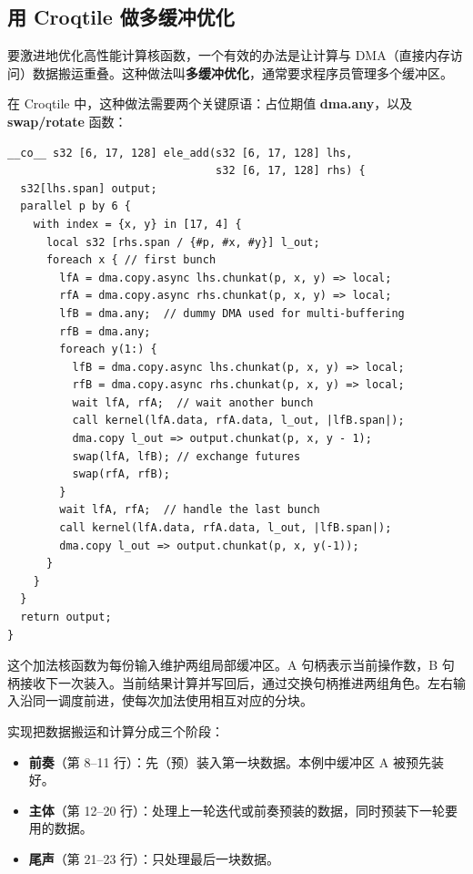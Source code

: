 \subsection*{用 Croqtile 做多缓冲优化}

要激进地优化高性能计算核函数，一个有效的办法是让计算与 DMA（直接内存访问）数据搬运重叠。这种做法叫\textbf{多缓冲优化}，通常要求程序员管理多个缓冲区。

在 Croqtile 中，这种做法需要两个关键原语：占位期值 \textbf{dma.any}，以及 \textbf{swap/rotate} 函数：

\begin{lstlisting}[language=croqtile,caption={用 Croqtile 做多缓冲优化}]
__co__ s32 [6, 17, 128] ele_add(s32 [6, 17, 128] lhs,
                                s32 [6, 17, 128] rhs) {
  s32[lhs.span] output;
  parallel p by 6 {
    with index = {x, y} in [17, 4] {
      local s32 [rhs.span / {#p, #x, #y}] l_out;
      foreach x { // first bunch
        lfA = dma.copy.async lhs.chunkat(p, x, y) => local;
        rfA = dma.copy.async rhs.chunkat(p, x, y) => local;
        lfB = dma.any;  // dummy DMA used for multi-buffering
        rfB = dma.any;
        foreach y(1:) {
          lfB = dma.copy.async lhs.chunkat(p, x, y) => local;
          rfB = dma.copy.async rhs.chunkat(p, x, y) => local;
          wait lfA, rfA;  // wait another bunch
          call kernel(lfA.data, rfA.data, l_out, |lfB.span|);
          dma.copy l_out => output.chunkat(p, x, y - 1);
          swap(lfA, lfB); // exchange futures
          swap(rfA, rfB);
        }
        wait lfA, rfA;  // handle the last bunch
        call kernel(lfA.data, rfA.data, l_out, |lfB.span|);
        dma.copy l_out => output.chunkat(p, x, y(-1));
      }
    }
  }
  return output;
}
\end{lstlisting}

这个加法核函数为每份输入维护两组局部缓冲区。A 句柄表示当前操作数，B 句柄接收下一次装入。当前结果计算并写回后，通过交换句柄推进两组角色。左右输入沿同一调度前进，使每次加法使用相互对应的分块。

实现把数据搬运和计算分成三个阶段：

\begin{itemize}[leftmargin=1.6em]
\item \textbf{前奏}（第 8--11 行）：先（预）装入第一块数据。本例中缓冲区 A 被预先装好。
\item \textbf{主体}（第 12--20 行）：处理上一轮迭代或前奏预装的数据，同时预装下一轮要用的数据。
\item \textbf{尾声}（第 21--23 行）：只处理最后一块数据。
\end{itemize}

